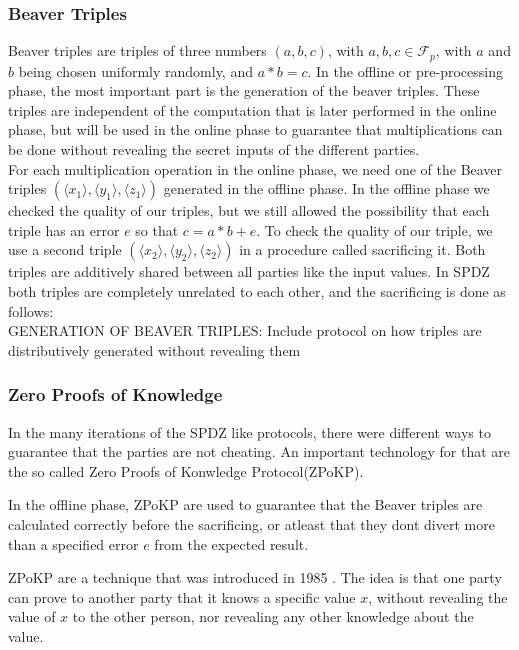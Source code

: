 \documentclass[english,runningheads,a4paper]{llncs}[2018/03/10]
\begin{document}
\subsubsection{Beaver Triples}

Beaver triples are triples of three numbers \((a,b,c)\), with \( a,b,c\in \mathcal{F}_p \), with \(a\) and \(b\) being chosen uniformly randomly, and \(a*b=c\).
In the offline or pre-processing phase, the most important part is the generation of the beaver triples. These triples  are independent of the computation that is later performed in the online phase, but will be used in the online phase to guarantee that multiplications can be done without revealing the secret inputs of the different parties.\\

For each multiplication operation in the online phase, we need one of the Beaver triples \( (\langle x_1 \rangle ,\langle y_1\rangle , \langle z_1\rangle )\) generated in the offline phase. In the offline phase we checked the quality of our triples, but we still allowed the possibility that each triple has an error \(e\) so that \(c=a*b+e\). To check the quality of our triple, we use a second triple \( (\langle x_2 \rangle ,\langle y_2\rangle ,\langle z_2\rangle )\) in a procedure called sacrificing it. Both triples are additively shared between all parties like the input values. In SPDZ both triples are completely unrelated to each other, and the sacrificing is done as follows:\\


GENERATION OF BEAVER TRIPLES: Include protocol on how triples are distributively generated without revealing them



\subsubsection{Zero Proofs of Knowledge}
In the many iterations of the SPDZ like protocols, there were different ways to guarantee that the parties are not cheating. An important technology for that are the so called Zero Proofs of Konwledge Protocol(ZPoKP).

In the offline phase, ZPoKP are used to guarantee that the Beaver triples are calculated correctly before the sacrificing, or atleast that they dont divert more than a specified error \(e\) from the expected result.

ZPoKP are a technique that was introduced  in 1985 \cite{Goldwasser:1985:KCI:22145.22178}. The idea is that one party can prove to another party that it knows a specific value \(x\), without revealing the value of \(x\) to the other person, nor revealing any other knowledge about the value. 
\end{document}
